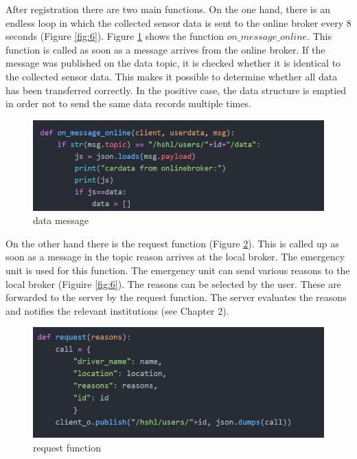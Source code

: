 After registration there are two main functions. On the one hand, there is an endless loop in which the collected sensor data is sent to the online broker every 8 seconds (Figure \ref{fig:6}). Figure \ref{fig:7} shows the function $on\_message\_online$. This function is called as soon as a message arrives from the online broker. If the message was published on the data topic, it is checked whether it is identical to the collected sensor data. This makes it possible to determine whether all data has been transferred correctly. In the positive case, the data structure is emptied in order not to send the same data records multiple times.\\


\begin{figure}
\sidecaption
\includegraphics[scale=.5]{images/images_michael/data_message.JPG}
\caption{data message}
\label{fig:7}
\end{figure}

On the other hand there is the request function (Figure \ref{fig:5}). This is called up as soon as a message in the topic reason arrives at the local broker. The emergency unit is used for this function. The emergency unit can send various reasons to the local broker (Figuire \ref{fig:6}). The reasons can be selected by the user. These are forwarded to the server by the request function. The server evaluates the reasons and notifies the relevant institutions (see Chapter 2).\\


\begin{figure}
\sidecaption
\includegraphics[scale=.5]{images/images_michael/request_function.JPG}
\caption{request function}
\label{fig:5}
\end{figure}

